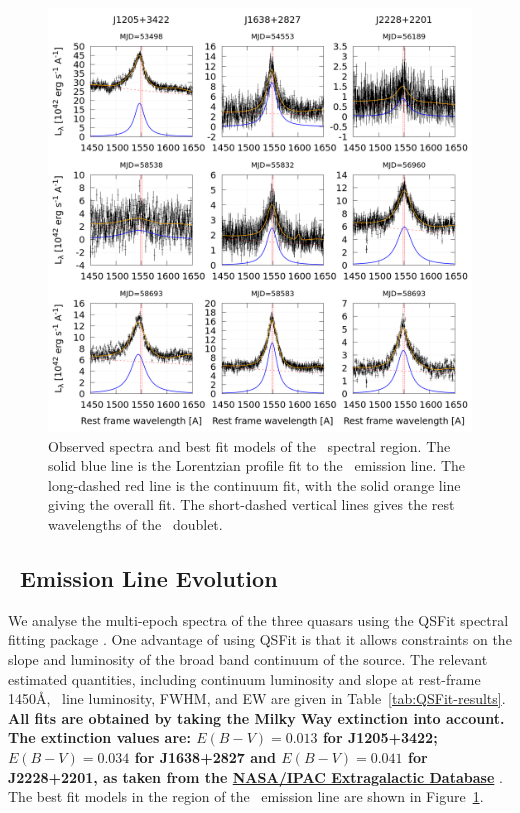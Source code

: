 \documentclass[fleqn,usenatbib]{mnras}
\begin{document}
\begin{figure}
  \centering
  \includegraphics[width=18.40cm, trim=0.37cm 0.3cm 0.0cm 0.2cm, clip]{figures/CIVregions.png}
    \vspace{-18pt}
  \caption{Observed spectra and best fit models of the \civ\ spectral region.
    The solid blue line is the Lorentzian profile fit to the \civ\ emission line.
    The long-dashed red line is the continuum fit, with the solid orange
    line giving the overall fit. The short-dashed vertical lines gives the
    rest wavelengths of the \civ\ doublet. }
  \label{fig:QSFit-CIV}
\end{figure}

\subsection{\civ\ Emission Line Evolution}
We analyse the multi-epoch spectra of the three quasars using the
QSFit spectral fitting package \citep{Calderone2017}.  One advantage
of using QSFit is that it allows constraints on the slope and
luminosity of the broad band continuum of the source. The relevant
estimated quantities, including continuum luminosity and slope at
rest-frame 1450\AA, \civ\ line luminosity, FWHM, and EW are given in
Table~\ref{tab:QSFit-results}.  {\bf All fits are obtained by taking
the Milky Way extinction \citep{Schlafly2011} into account.  The
extinction values are: $E(B-V) =0.013$ for J1205+3422; $E(B-V) =0.034$
for J1638+2827 and $E(B-V) =0.041$ for J2228+2201, as taken from the
\href{http://ned.ipac.caltech.edu/}{NASA/IPAC Extragalactic Database} 
}. The best fit models in the region of the \civ\ emission line are
shown in Figure~\ref{fig:QSFit-CIV}.
\end{document}
